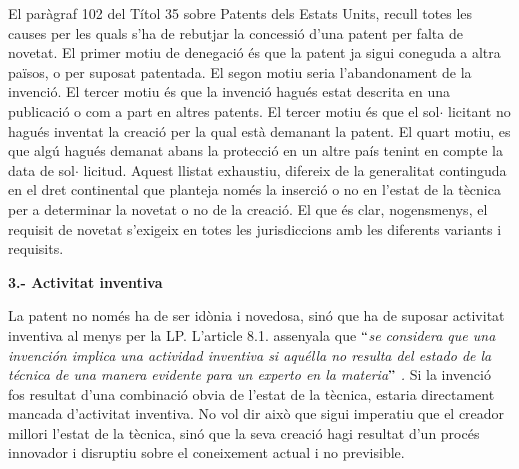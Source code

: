 \documentclass[12pt]{article}
\begin{document}
\vspace{\baselineskip}
\begin{justify}
El paràgraf 102 del Títol 35 sobre Patents dels Estats Units, recull totes les causes per les quals s’ha de rebutjar la concessió d’una patent per falta de novetat. El primer motiu de denegació és que la patent ja sigui coneguda a altra països, o per suposat patentada. El segon motiu seria l’abandonament de la invenció. El tercer motiu és que la invenció hagués estat descrita en una publicació o com a part en altres patents. El tercer motiu és que el sol$ \cdot $ licitant no hagués inventat la creació per la qual està demanant la patent. El quart motiu, es que algú hagués demanat abans la protecció en un altre país tenint en compte la data de sol$ \cdot $ licitud. Aquest llistat exhaustiu, difereix de la generalitat continguda en el dret continental que planteja només la inserció o no en l’estat de la tècnica per a determinar la novetat o no de la creació. El que és clar, nogensmenys, el requisit de novetat s’exigeix en totes les jurisdiccions amb les diferents variants i requisits. 
\end{justify}\par


\vspace{\baselineskip}
\textbf{3.- Activitat inventiva}\par


\vspace{\baselineskip}
La patent no només ha de ser idònia i novedosa, sinó que ha de suposar activitat inventiva al menys per la LP. L’article 8.1. assenyala que $``$\textit{se considera que una invención implica una actividad inventiva si aquélla no resulta del estado de la técnica de una manera evidente para un experto en la materia$"$ . }Si la invenció fos resultat d’una combinació obvia de l’estat de la tècnica, estaria directament mancada d’activitat inventiva. No vol dir això que sigui imperatiu que el creador millori l’estat de la tècnica, sinó que la seva creació hagi resultat d’un procés innovador i disruptiu sobre el coneixement actual i no previsible. \par
\end{document}
